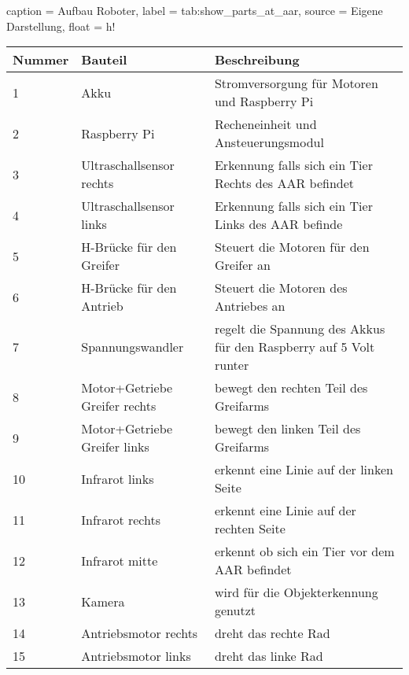 \begin{dhbwtable}{%
    caption	= Aufbau Roboter,
    label	= tab:show_parts_at_aar,
    source	= Eigene Darstellung,
    float   = h!
}
    \begin{tabularx}{\textwidth}{lXX}
        \toprule
        \textbf{Nummer}     & \textbf{Bauteil}              & \textbf{Beschreibung} \\\midrule
        1   	            & Akku                          & Stromversorgung für Motoren und Raspberry Pi \\
        2                   & Raspberry Pi                  & Recheneinheit und Ansteuerungsmodul \\
        3                   & Ultraschallsensor rechts      & Erkennung falls sich ein Tier Rechts des AAR befindet \\
        4                   & Ultraschallsensor links       & Erkennung falls sich ein Tier Links des AAR befinde \\
        5                   & H-Brücke für den Greifer      & Steuert die Motoren für den Greifer an \\
        6                   & H-Brücke für den Antrieb      & Steuert die Motoren des Antriebes an \\
        7                   & Spannungswandler              & regelt die Spannung des Akkus für den Raspberry auf 5 Volt runter \\
        8                   & Motor+Getriebe Greifer rechts & bewegt den rechten Teil des Greifarms \\
        9                   & Motor+Getriebe Greifer links  & bewegt den linken Teil des Greifarms \\
        10                  & Infrarot links                & erkennt eine Linie auf der linken Seite \\
        11                  & Infrarot rechts               & erkennt eine Linie auf der rechten Seite \\
        12                  & Infrarot mitte                & erkennt ob sich ein Tier vor dem AAR befindet \\
        13                  & Kamera                        & wird für die Objekterkennung genutzt \\
        14                  & Antriebsmotor rechts          & dreht das rechte Rad \\
        15                  & Antriebsmotor links           & dreht das linke Rad \\\bottomrule
    \end{tabularx}    
\end{dhbwtable}




